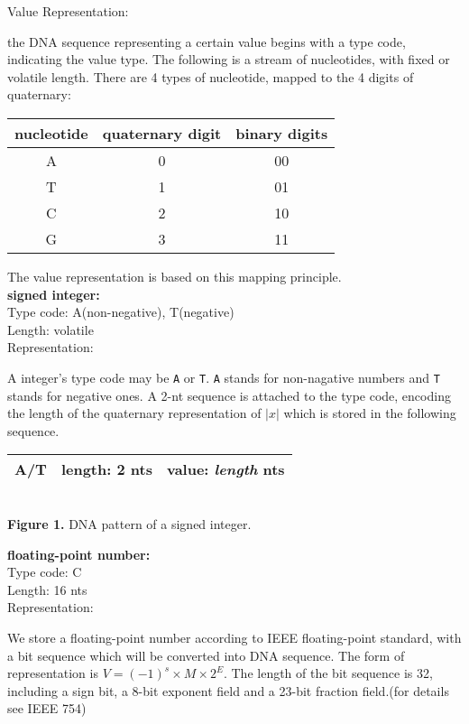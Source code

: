 \documentclass{article}
\begin{document}
\noindent
{\large Value Representation:}
\par the DNA sequence representing a certain value begins with a type code, indicating the value type. The following is a stream of nucleotides, with fixed or volatile length. There are 4 types of nucleotide, mapped to the 4 digits of quaternary:
\begin{center}
    \begin{tabular}{c|c|c}
        nucleotide & quaternary digit & binary digits \\
        \hline
        A & 0 & 00 \\
        T & 1 & 01 \\
        C & 2 & 10 \\
        G & 3 & 11 \\
    \end{tabular}
\end{center}
The value representation is based on this mapping principle.\\[6pt]
\textbf{signed integer:}\\
Type code: A(non-negative), T(negative)\\
Length: volatile\\
Representation: 
\par A integer's type code may be \texttt{A} or \texttt{T}. \texttt{A} stands for non-nagative numbers and \texttt{T} stands for negative ones. A 2-nt sequence is attached to the type code, encoding the length of the quaternary representation of $|x|$ which is stored in the following sequence.  
\begin{center}
    \begin{tabular}{|c|c|c|}
        \hline
        A/T & length: 2 nts & value: \textit{length} nts \\
        \hline
    \end{tabular}
    \\[3pt]{\small \textbf{Figure 1.} DNA pattern of a signed integer.}
\end{center}
\textbf{floating-point number:}\\
Type code: C\\
Length: 16 nts\\
Representation: 
\par We store a floating-point number according to IEEE floating-point standard, with a bit sequence which will be converted into DNA sequence. The form of representation is $V=(-1)^s \times M \times 2^E$. The length of the bit sequence is 32, including a sign bit, a 8-bit exponent field and a 23-bit fraction field.(for details see IEEE 754)
\end{document}
